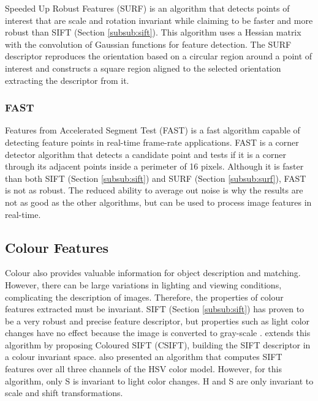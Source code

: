 Speeded Up Robust Features (SURF) \cite{bay2006surf} is an algorithm that detects points of interest that are scale and rotation invariant while claiming to be faster and more robust than SIFT (Section \ref{subsub:sift}). This algorithm uses a Hessian matrix with the convolution of Gaussian functions for feature detection. The SURF descriptor reproduces the orientation based on a circular region around a point of interest and constructs a square region aligned to the selected orientation extracting the descriptor from it.

\subsubsection{FAST}
\label{subsub:fast}

Features from Accelerated Segment Test (FAST) \cite{rosten2006machine} is a fast algorithm capable of detecting feature points in real-time frame-rate applications. FAST is a corner detector algorithm that detects a candidate point and tests if it is a corner through its adjacent points inside a perimeter of 16 pixels. Although it is faster than both SIFT (Section \ref{subsub:sift}) and SURF (Section \ref{subsub:surf}), FAST is not as robust. The reduced ability to average out noise is why the results are not as good as the other algorithms, but can be used to process image features in real-time.

\subsection{Colour Features}

Colour also provides valuable information for object description and matching. However, there can be large variations in lighting and viewing conditions, complicating the description of images. Therefore, the properties of colour features extracted must be invariant.
SIFT (Section \ref{subsub:sift}) has proven to be a very robust and precise feature descriptor, but properties such as light color changes have no effect because the image is converted to gray-scale \cite{van2008comparison}. \citeauthor{abdel2006csift} \cite{abdel2006csift} extends this algorithm by proposing Coloured SIFT (CSIFT), building the SIFT descriptor in a colour invariant space.
\citeauthor{bosch2007representing} \cite{bosch2007representing} also presented an algorithm that computes SIFT features over all three channels of the HSV color model. However, for this algorithm, only S is invariant to light color changes. H and S are only invariant to scale and shift transformations.

